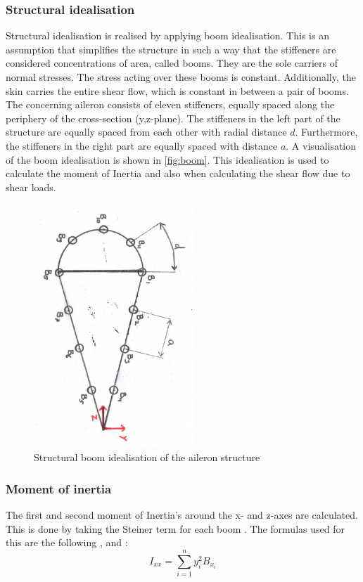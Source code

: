 \subsubsection{Structural idealisation}
\label{subsubsec:boom}
Structural idealisation is realised by applying boom idealisation. This is an assumption that simplifies the structure in such a way that the stiffeners are considered concentrations of area, called booms. They are the sole carriers of normal stresses. The stress acting over these booms is constant. Additionally, the skin carries the entire shear flow, which is constant in between a pair of booms.\\

\noindent The concerning aileron consists of eleven stiffeners, equally spaced along the periphery of the cross-section (y,z-plane). The stiffeners in the left part of the structure are equally spaced from each other with radial distance $d$. Furthermore, the stiffeners in the right part are equally spaced with distance $a$. A visualisation of the boom idealisation is shown in \autoref{fig:boom}.
This idealisation is used to calculate the moment of Inertia and also when calculating the shear flow due to shear loads.

\begin{figure}[H]
    \centering
    \includegraphics[width=6cm,angle=90]{Images/boom.pdf}
    \caption{Structural boom idealisation of the aileron structure}
    \label{fig:boom}
\end{figure}

\subsubsection{Moment of inertia}
\label{subsubsec:MoI}
The first and second moment of Inertia's around the x- and z-axes are calculated. This is done by taking the Steiner term for each boom \cite{the_book}. The formulas used for this are the following ,  and :
\begin{equation}
\label{MoI_xx}
    I_{x x}=\sum_{i=1}^{n} y_{i}^{2} B_{x_{i}}
\end{equation}

